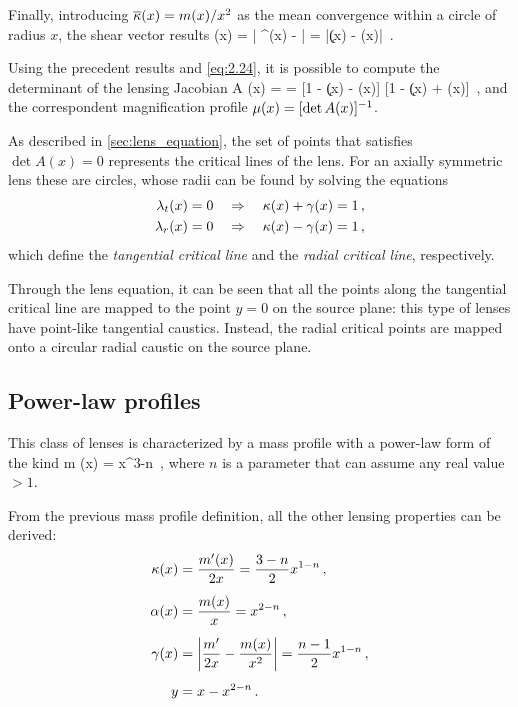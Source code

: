 Finally, introducing $\overline{\kappa} (x) = m (x) / x^2$ as the mean convergence within a circle of radius $x$, the shear vector results
\be
\label{eq:3.22}
\g (x) =  \left| \a^\prime (x) -  \right| = |\k (x) - \overline{\k} (x)| \,.
\ee

Using the precedent results and \cref{eq:2.24}, it is possible to compute the determinant of the lensing Jacobian
\be
\label{eq:3.23}
\det A (x) =   = [1 - \k (x) - \g (x)] [1 - \k (x) + \g (x)] \,,
\ee
and the correspondent magnification profile $\mu (x) = [\det A (x)]^{-1}$.

As described in \cref{sec:lens_equation}, the set of points that satisfies $\det A (x) = 0$ represents the critical lines of the lens. For an axially symmetric lens these are circles, whose radii can be found by solving the equations
\begin{subequations}
\begin{align}
    \label{eq:3.24a}
    \lambda_t (x) & = 0 \quad \Rightarrow \quad \kappa (x) + \gamma (x) = 1 \,,
    \\
    \label{eq:3.24b}
    \lambda_r (x) & = 0 \quad \Rightarrow \quad \kappa (x) - \gamma (x) = 1 \,,
\end{align}
\end{subequations}
which define the \emph{tangential critical line} and the \emph{radial critical line}, respectively.

Through the lens equation, it can be seen that all the points along the tangential critical line are mapped to the point $y = 0$ on the source plane: this type of lenses have point-like tangential caustics. Instead, the radial critical points are mapped onto a circular radial caustic on the source plane.


\subsection{Power-law profiles}
\label{subsec:power_law_profiles}
This class of lenses is characterized by a mass profile with a power-law form of the kind
\be
\label{eq:3.25}
m (x) = x^{3-n} \,,
\ee
where $n$ is a parameter that can assume any real value $>1$.

From the previous mass profile definition, all the other lensing properties can be derived:
\begin{equation}
\label{eq:3.26}
\begin{aligned}
    \kappa (x) & = \frac{m^\prime (x)}{2 x} = \frac{3 - n}{2} x^{1 - n} \,, \\[5pt]
    \alpha (x) & = \frac{m (x)}{x} = x^{2 - n} \,, \\[5pt]
    \gamma (x) & = \left| \frac{m^\prime}{2 x} - \frac{m (x)}{x^2} \right| = \frac{n - 1}{2} x^{1 - n} \,, \\[5pt]
    y & = x - x^{2-n} \,.
\end{aligned}
\end{equation}

